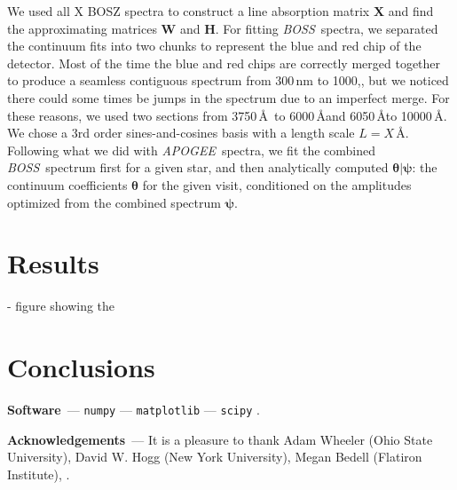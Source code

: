 \documentclass[modern]{aastex631}
\renewcommand{\paragraph}[1]{\medskip\par\noindent\textbf{#1}~---}
\newcommand{\project}[1]{\textit{#1}}
\newcommand{\vectheta}{\boldsymbol{\theta}}
\newcommand{\vecpsi}{\boldsymbol{\psi}}
\newcommand{\vecW}{\mathbf{W}}
\newcommand{\vecH}{\mathbf{H}}
\newcommand{\vecX}{\mathbf{X}}
\newcommand{\apogee}{\project{APOGEE}}
\newcommand{\boss}{\project{BOSS}}
\newcommand{\todo}[1]{\textcolor{tab:blue}{#1}}
\begin{document}
We used all \todo{X} BOSZ spectra to construct a line absorption matrix $\vecX$ and find the approximating matrices $\vecW$ and $\vecH$. For fitting \boss\ spectra, we separated the continuum fits into two chunks to represent the blue and red chip of the detector. Most of the time the blue and red chips are correctly merged together to produce a seamless contiguous spectrum from \todo{300\,nm to 1000,\nm}, but we noticed there could some times be jumps in the spectrum due to an imperfect merge. For these reasons, we used two sections from \todo{3750\,\AA\ to 6000\,\AA and 6050\,\AA to 10000\,\AA}. We chose a \todo{3rd} order sines-and-cosines basis with a length scale $L = X$\,\AA. Following what we did with \apogee\ spectra, we fit the combined \boss\ spectrum first for a given star, and then analytically computed $\vectheta{}|\vecpsi$: the continuum coefficients $\vectheta$ for the given visit, conditioned on the amplitudes optimized from the combined spectrum $\vecpsi$.

\section{Results}\label{sec:results}


\begin{figure*}
    \caption{The median pixel $\chi^2$ value as a function of \emph{Gaia} $\mathrm{BP} - \mathrm{RP}$ color for main-sequence stars observed with the BOSS spectrograph. \todo{Should expect to see increasing residuals due to TiO bands not captured by the model, and emission lines.}}
\end{figure*}


- figure showing the 

\section{Conclusions}\label{sec:conclusions}




\paragraph{Software}
\texttt{numpy} \citep{numpy} ---
\texttt{matplotlib} \citep{matplotlib} ---
\texttt{scipy} \citep{scipy}.

\paragraph{Acknowledgements}
It is a pleasure to thank
    Adam Wheeler (Ohio State University),
    David W. Hogg (New York University),
    Megan Bedell (Flatiron Institute),
.

%
\end{document}
